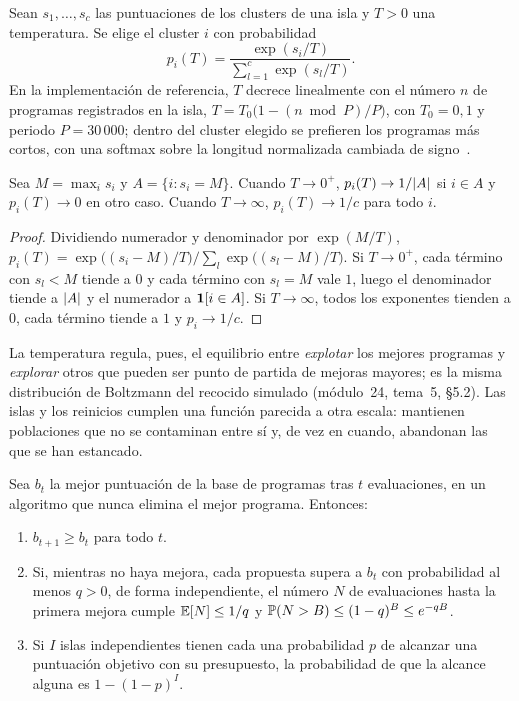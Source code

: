 \begin{definicion}\label{def:softmax-clusters}
Sean $s_1,\dots,s_c$ las puntuaciones de los clusters de una isla y $T>0$ una temperatura. Se elige el cluster $i$ con probabilidad
\[
p_i(T)=\frac{\exp(s_i/T)}{\sum_{l=1}^{c}\exp(s_l/T)}.
\]
En la implementación de referencia, $T$ decrece linealmente con el número $n$ de programas registrados en la isla, $T=T_0\bigl(1-(n\bmod P)/P\bigr)$, con $T_0=0{,}1$ y periodo $P=30\,000$; dentro del cluster elegido se prefieren los programas más cortos, con una softmax sobre la longitud normalizada cambiada de signo~\cite{funsearch-code}.
\end{definicion}

\begin{proposicion}\label{prop:temperatura}
Sea $M=\max_i s_i$ y $A=\{i: s_i=M\}$. Cuando $T\to 0^{+}$, $p_i(T)\to 1/\lvert A\rvert$ si $i\in A$ y $p_i(T)\to 0$ en otro caso. Cuando $T\to\infty$, $p_i(T)\to 1/c$ para todo $i$.
\end{proposicion}

\begin{proof}
Dividiendo numerador y denominador por $\exp(M/T)$, $p_i(T)=\exp\bigl((s_i-M)/T\bigr)\big/\sum_l\exp\bigl((s_l-M)/T\bigr)$. Si $T\to 0^{+}$, cada término con $s_l<M$ tiende a $0$ y cada término con $s_l=M$ vale $1$, luego el denominador tiende a $\lvert A\rvert$ y el numerador a $\mathbf{1}[i\in A]$. Si $T\to\infty$, todos los exponentes tienden a $0$, cada término tiende a $1$ y $p_i\to 1/c$.
\end{proof}

La temperatura regula, pues, el equilibrio entre \emph{explotar} los mejores programas y \emph{explorar} otros que pueden ser punto de partida de mejoras mayores; es la misma distribución de Boltzmann del recocido simulado (módulo~24, tema~5, §5.2). Las islas y los reinicios cumplen una función parecida a otra escala: mantienen poblaciones que no se contaminan entre sí y, de vez en cuando, abandonan las que se han estancado.

\begin{proposicion}\label{prop:espera}
Sea $b_t$ la mejor puntuación de la base de programas tras $t$ evaluaciones, en un algoritmo que nunca elimina el mejor programa. Entonces:
\begin{enumerate}
  \item $b_{t+1}\ge b_t$ para todo $t$.
  \item Si, mientras no haya mejora, cada propuesta supera a $b_t$ con probabilidad al menos $q>0$, de forma independiente, el número $N$ de evaluaciones hasta la primera mejora cumple $\mathbb{E}[N]\le 1/q$ y $\mathbb{P}(N>B)\le(1-q)^{B}\le e^{-qB}$.
  \item Si $I$ islas independientes tienen cada una probabilidad $p$ de alcanzar una puntuación objetivo con su presupuesto, la probabilidad de que la alcance alguna es $1-(1-p)^{I}$.
\end{enumerate}
\end{proposicion}

